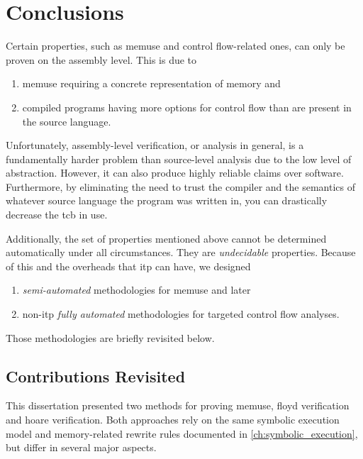 \chapter{Conclusions}\label{ch:conclusions}
Certain properties, such as \gls{memuse} and control flow-related ones, can only be proven on the assembly level.
This is due to
\begin{enumerate}
  \item \gls{memuse} requiring a concrete representation of memory and
  \item compiled programs having more options for control flow than are present in the source language.
\end{enumerate}
Unfortunately, assembly-level verification, or analysis in general, is a fundamentally harder problem than source-level analysis due to the low level of abstraction.
However, it can also produce highly reliable claims over software.
Furthermore, by eliminating the need to trust the compiler and the semantics of whatever source language the program was written in, you can drastically decrease the \gls{tcb} in use.

Additionally, the set of properties mentioned above cannot be determined automatically under all circumstances. They are \emph{undecidable} properties.
Because of this and the overheads that \gls{itp} can have, we designed
\begin{enumerate}
  \item \emph{semi-automated} methodologies for \gls{memuse} and later
  \item non-\gls{itp} \emph{fully automated} methodologies for targeted control flow analyses.
\end{enumerate}
Those methodologies are briefly revisited below.

\section{Contributions Revisited}
This dissertation presented two methods for proving \gls{memuse},
\gls{floyd} verification and \gls{hoare} verification.
Both approaches rely on the same symbolic execution model and memory-related rewrite rules documented in \cref{ch:symbolic_execution}, but differ in several major aspects.
\begin{comment}
  \begin{remark}[Hoare triple usage]
    Technically they also both use Hoare triples, but only \cref{ch:syntax} uses proper Hoare rules.
    \Cref{ch:cfg} uses a modified style that takes a halting condition~$H$ instead of a syntactic construct in the middle.
  \end{remark}
\end{comment}


